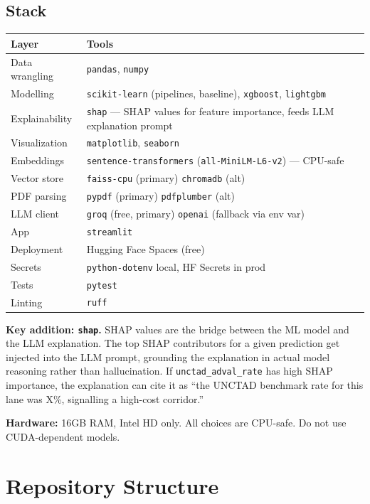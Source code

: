 \documentclass[11pt, a4paper]{article}
\begin{document}
\subsection{Stack}

\begin{tabularx}{\textwidth}{lX}
\toprule
\textbf{Layer} & \textbf{Tools} \\
\midrule
Data wrangling & \texttt{pandas}, \texttt{numpy} \\
Modelling & \texttt{scikit-learn} (pipelines, baseline), \texttt{xgboost}, \texttt{lightgbm} \\
Explainability & \texttt{shap} --- SHAP values for feature importance, feeds LLM explanation prompt \\
Visualization & \texttt{matplotlib}, \texttt{seaborn} \\
Embeddings & \texttt{sentence-transformers} (\texttt{all-MiniLM-L6-v2}) --- CPU-safe \\
Vector store & \texttt{faiss-cpu} (primary) \textbar{} \texttt{chromadb} (alt) \\
PDF parsing & \texttt{pypdf} (primary) \textbar{} \texttt{pdfplumber} (alt) \\
LLM client & \texttt{groq} (free, primary) \textbar{} \texttt{openai} (fallback via env var) \\
App & \texttt{streamlit} \\
Deployment & Hugging Face Spaces (free) \\
Secrets & \texttt{python-dotenv} local, HF Secrets in prod \\
Tests & \texttt{pytest} \\
Linting & \texttt{ruff} \\
\bottomrule
\end{tabularx}

\textbf{Key addition: \texttt{shap}.} SHAP values are the bridge between the ML model and the LLM explanation. The top SHAP contributors for a given prediction get injected into the LLM prompt, grounding the explanation in actual model reasoning rather than hallucination. If \texttt{unctad\_adval\_rate} has high SHAP importance, the explanation can cite it as ``the UNCTAD benchmark rate for this lane was X\%, signalling a high-cost corridor.''

\textbf{Hardware:} 16GB RAM, Intel HD only. All choices are CPU-safe. Do not use CUDA-dependent models.

\section{Repository Structure}
\end{document}
